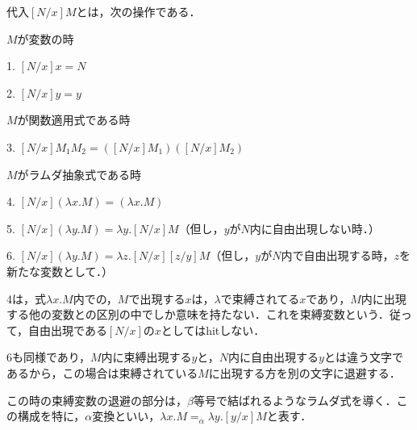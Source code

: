\documentclass[uplatex, 12pt, dvipdfmx]{jsreport}
\begin{document}
\begin{definition}[代入の形式的定義]代入$[N/x]M$とは，次の操作である．
    
    $M$が変数の時

    1. $[N/x]x=N$

    2. $[N/x]y=y$

    $M$が関数適用式である時

    3. $[N/x]M_1M_2=([N/x]M_1)([N/x]M_2)$

    $M$がラムダ抽象式である時

    4. $[N/x](\lambda x.M)=(\lambda x.M)$

    5. $[N/x](\lambda y.M)=\lambda y.[N/x]M$（但し，$y$が$N$内に自由出現しない時．）

    6. $[N/x](\lambda y.M)=\lambda z.[N/x][z/y]M$（但し，$y$が$N$内で自由出現する時，$z$を新たな変数として．）
\end{definition}
\begin{remark}
    4は，式$\lambda x.M$内での，$M$で出現する$x$は，$\lambda$で束縛されてる$x$であり，$M$内に出現する他の変数との区別の中でしか意味を持たない．これを束縛変数という．従って，自由出現である$[N/x]$の$x$としてはhitしない．

    6も同様であり，$M$内に束縛出現する$y$と，$N$内に自由出現する$y$とは違う文字であるから，この場合は束縛されている$M$に出現する方を別の文字に退避する．
    
    この時の束縛変数の退避の部分は，$\beta$等号で結ばれるようなラムダ式を導く．この構成を特に，$\alpha$変換といい，$\lambda x.M=_\alpha \lambda y.[y/x]M$と表す．
\end{remark}
\end{document}
